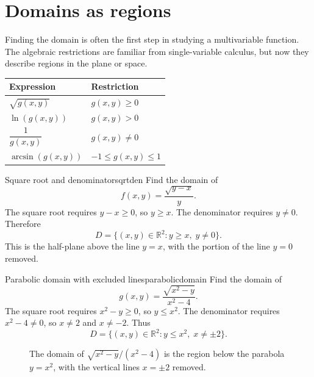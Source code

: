 \documentclass[11pt]{article}
\newcommand{\R}{\mathbb R}
\begin{document}
\section{Domains as regions}

Finding the domain is often the first step in studying a multivariable function. The algebraic restrictions are familiar from single-variable calculus, but now they describe regions in the plane or space.

\begin{center}
\begin{tabular}{@{}ll@{}}
\toprule
Expression & Restriction \\
\midrule
$\sqrt{g(x,y)}$ & $g(x,y)\ge 0$ \\
$\ln(g(x,y))$ & $g(x,y)>0$ \\
$\dfrac{1}{g(x,y)}$ & $g(x,y)\ne 0$ \\
$\arcsin(g(x,y))$ & $-1\le g(x,y)\le 1$ \\
\bottomrule
\end{tabular}
\end{center}

\begin{workedexample}{Square root and denominator}{sqrtden}
Find the domain of
\[
f(x,y)=\frac{\sqrt{y-x}}{y}.
\]
The square root requires $y-x\ge 0$, so $y\ge x$. The denominator requires $y\ne 0$. Therefore
\[
D=\{(x,y)\in \R^2:y\ge x,\; y\ne 0\}.
\]
This is the half-plane above the line $y=x$, with the portion of the line $y=0$ removed.
\end{workedexample}

\begin{workedexample}{Parabolic domain with excluded lines}{parabolicdomain}
Find the domain of
\[
g(x,y)=\frac{\sqrt{x^2-y}}{x^2-4}.
\]
The square root requires $x^2-y\ge 0$, so $y\le x^2$. The denominator requires $x^2-4\ne 0$, so $x\ne 2$ and $x\ne -2$. Thus
\[
D=\{(x,y)\in \R^2:y\le x^2,\; x\ne \pm 2\}.
\]
\end{workedexample}

\begin{figure}[H]
\centering
{}
\caption{The domain of $\sqrt{x^2-y}/(x^2-4)$ is the region below the parabola $y=x^2$, with the vertical lines $x=\pm 2$ removed.}
\end{figure}
\end{document}
